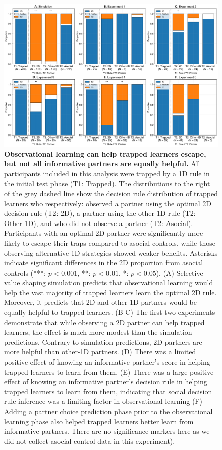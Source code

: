 \documentclass[11pt]{article} %
\begin{document}
\begin{figure}
    \centering
    \vspace{-35pt}
    \includegraphics[width=1.0\linewidth]{trapped_learner_comparison.pdf}
    \caption{\textbf{Observational learning can help trapped learners escape, but not all informative partners are equally helpful.} All participants included in this analysis were trapped by a 1D rule in the initial test phase (T1: Trapped). The distributions to the right of the grey dashed line show the decision rule distribution of trapped learners who respectively: observed a partner using the optimal 2D decision rule (T2: 2D), a partner using the other 1D rule (T2: Other-1D), and who did not observe a partner (T2: Asocial). Participants with an optimal 2D partner were significantly more likely to escape their traps compared to asocial controls, while those observing alternative 1D strategies showed weaker benefits. Asterisks indicate significant differences in the 2D proportion from asocial controls (***: $p < 0.001$, **: $p < 0.01$, *: $p < 0.05$). (A) Selective value shaping simulation predicts that observational learning would help the vast majority of trapped learners learn the optimal 2D rule. Moreover, it predicts that 2D and other-1D partners would be equally helpful to trapped learners. (B-C) The first two experiments demonstrate that while observing a 2D partner can help trapped learners, the effect is much more modest than the simulation predictions. Contrary to simulation predictions, 2D partners are more helpful than other-1D partners. (D) There was a limited positive effect of knowing an informative partner's score in helping trapped learners to learn from them. (E) There was a large positive effect of knowing an informative partner's decision rule in helping trapped learners to learn from them, indicating that social decision rule inference was a limiting factor in observational learning (F) Adding a partner choice prediction phase prior to the observational learning phase also helped trapped learners better learn from informative partners. There are no significance markers here as we did not collect asocial control data in this experiment).}
    \label{fig:trapped-second-test}
\end{figure}
\end{document}
